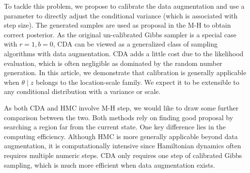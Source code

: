 \documentclass[10pt]{article}
\begin{document}
To tackle this problem, we propose to calibrate the data augmentation and use a parameter to directly adjust the conditional variance (which is associated with step size). The generated samples are used as proposal in the M-H to obtain correct posterior. As the original un-calibrated Gibbs sampler is a special case with $r=1, b=0$, CDA can be viewed as a generalized class of sampling algorithms with data augmentation. CDA adds a little cost due to the likelihood evaluation, which is often negligible as dominated by the random number generation. In this article, we demonstrate that calibration is generally applicable when $\theta \mid z$ belongs to the location-scale family. We expect it to be extensible to any conditional distribution with a variance or scale.

As both CDA and HMC involve M-H step, we would like to draw some further comparison between the two. Both methods rely on finding good proposal by searching a region far from the current state. One key difference lies in the computing efficiency. Although HMC is more generally applicable beyond data augmentation, it is computationally intensive since Hamiltonian dynamics often requires multiple numeric steps. CDA only requires one step of calibrated Gibbs sampling, which is much more efficient when data augmentation exists.




%
%
%
%
\end{document}

